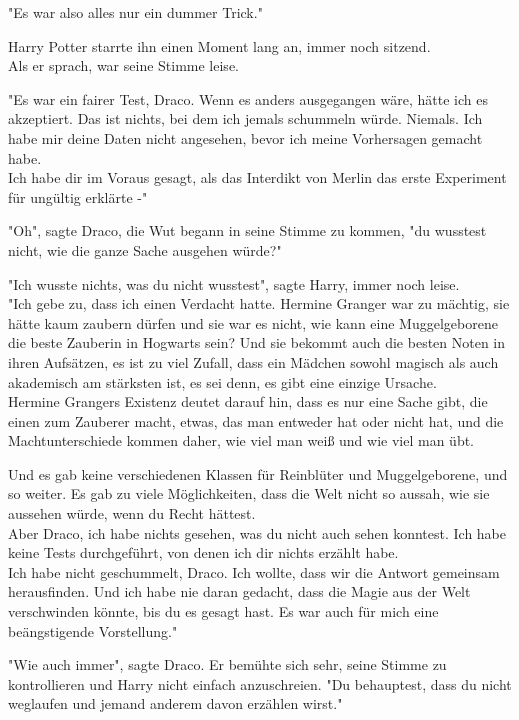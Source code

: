{"Es war also alles nur ein dummer Trick."

Harry Potter starrte ihn einen Moment lang an, immer noch sitzend.\\ Als er sprach, war seine Stimme leise.

"Es war ein fairer Test, Draco. Wenn es anders ausgegangen wäre, hätte ich es akzeptiert. Das ist nichts, bei dem ich jemals schummeln würde. Niemals. Ich habe mir deine Daten nicht angesehen, bevor ich meine Vorhersagen gemacht habe.\\ Ich habe dir im Voraus gesagt, als das Interdikt von Merlin das erste Experiment für ungültig erklärte -"

"Oh", sagte Draco, die Wut begann in seine Stimme zu kommen, "du wusstest nicht, wie die ganze Sache ausgehen würde?"

"Ich wusste nichts, was du nicht wusstest", sagte Harry, immer noch leise.\\ "Ich gebe zu, dass ich einen Verdacht hatte. Hermine Granger war zu mächtig, sie hätte kaum zaubern dürfen und sie war es nicht, wie kann eine Muggelgeborene die beste Zauberin in Hogwarts sein? Und sie bekommt auch die besten Noten in ihren Aufsätzen, es ist zu viel Zufall, dass ein Mädchen sowohl magisch als auch akademisch am stärksten ist, es sei denn, es gibt eine einzige Ursache.\\ Hermine Grangers Existenz deutet darauf hin, dass es nur eine Sache gibt, die einen zum Zauberer macht, etwas, das man entweder hat oder nicht hat, und die Machtunterschiede kommen daher, wie viel man weiß und wie viel man übt.

Und es gab keine verschiedenen Klassen für Reinblüter und Muggelgeborene, und so weiter. Es gab zu viele Möglichkeiten, dass die Welt nicht so aussah, wie sie aussehen würde, wenn du Recht hättest.\\ Aber Draco, ich habe nichts gesehen, was du nicht auch sehen konntest. Ich habe keine Tests durchgeführt, von denen ich dir nichts erzählt habe.\\ Ich habe nicht geschummelt, Draco. Ich wollte, dass wir die Antwort gemeinsam herausfinden. Und ich habe nie daran gedacht, dass die Magie aus der Welt verschwinden könnte, bis du es gesagt hast. Es war auch für mich eine beängstigende Vorstellung."

"Wie auch immer", sagte Draco. Er bemühte sich sehr, seine Stimme zu kontrollieren und Harry nicht einfach anzuschreien. "Du behauptest, dass du nicht weglaufen und jemand anderem davon erzählen wirst."

}
